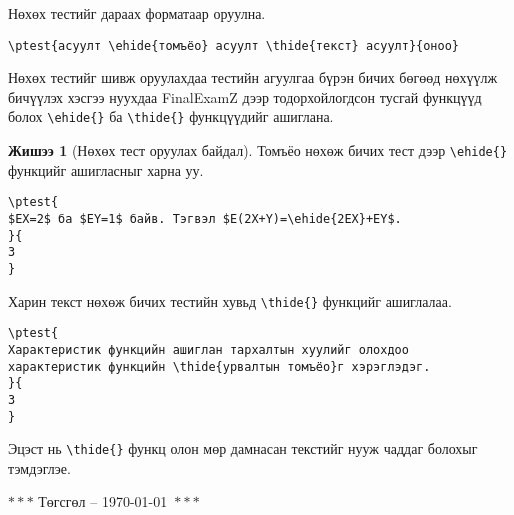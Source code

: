 \documentclass[10pt]{article}
\theoremstyle{definition}
\newtheorem{example}{Жишээ}
\begin{document}
Нөхөх тестийг дараах форматаар оруулна.
\begin{verbatim}
\ptest{асуулт \ehide{томъёо} асуулт \thide{текст} асуулт}{оноо}
\end{verbatim}
Нөхөх тестийг шивж оруулахдаа тестийн агуулгаа бүрэн бичих бөгөөд нөхүүлж бичүүлэх хэсгээ нуухдаа FinalExamZ дээр тодорхойлогдсон тусгай функцүүд болох \verb|\ehide{}| ба \verb|\thide{}| функцүүдийг ашиглана.

\begin{example}[Нөхөх тест оруулах байдал]
Томъёо нөхөж бичих тест дээр \verb|\ehide{}| функцийг ашигласныг харна уу.
\begin{verbatim}
\ptest{
$EX=2$ ба $EY=1$ байв. Тэгвэл $E(2X+Y)=\ehide{2EX}+EY$.
}{
3
}
\end{verbatim}
Харин текст нөхөж бичих тестийн хувьд \verb|\thide{}| функцийг ашиглалаа.
\begin{verbatim}
\ptest{
Характеристик функцийн ашиглан тархалтын хуулийг олохдоо 
характеристик функцийн \thide{урвалтын томъёо}г хэрэглэдэг.
}{
3
}
\end{verbatim}
\end{example}

Эцэст нь \verb|\thide{}| функц олон мөр дамнасан текстийг нууж чаддаг болохыг тэмдэглэе.

\begin{center}
 $\ast\ast\ast$ Төгсгөл -- \today\ $\ast\ast\ast$
\end{center}
\end{document}
